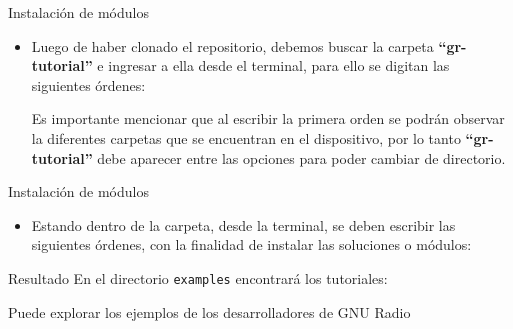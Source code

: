 \begin{frame}{Instalación de módulos}
\begin{itemize}
\item Luego de haber clonado el repositorio, debemos buscar la carpeta \textbf{“gr-tutorial”} e ingresar a ella desde el terminal, para ello se digitan las siguientes órdenes:


Es importante mencionar que al escribir la primera orden se podrán observar la diferentes carpetas que se encuentran en el dispositivo, por lo tanto \textbf{“gr-tutorial”} debe aparecer entre las opciones para poder cambiar de directorio. 
\end{itemize}
\end{frame}


\begin{frame}{Instalación de módulos}
\begin{itemize}
\item Estando dentro de la carpeta, desde la terminal, se deben escribir las siguientes órdenes, con la finalidad de instalar las soluciones o módulos:


\end{itemize}
\end{frame}

\begin{frame}{Resultado}
En el directorio {\tt examples} encontrará los tutoriales:

Puede explorar los ejemplos de los desarrolladores de GNU Radio 
\end{frame}
